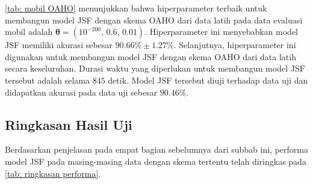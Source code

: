 \noindent \ref{tab: mobil OAHO} menunjukkan bahwa hiperparameter terbaik untuk membangun model JSF dengan skema OAHO dari data latih pada data evaluasi mobil adalah $\boldsymbol{\theta} = (10^{-200} \text{,  } \allowbreak \num{0,6} \text{,  } \allowbreak \num{0,01})$. Hiperparameter ini menyebabkan model JSF memiliki akurasi sebesar $\num{90,66}\% \pm \num{1,27}\%$. Selanjutnya, hiperparameter ini digunakan untuk membangun model JSF dengan skema OAHO dari data latih secara keseluruhan. Durasi waktu yang diperlukan untuk membangun model JSF tersebut adalah selama $845$ detik. Model JSF tersebut diuji terhadap data uji dan didapatkan akurasi pada data uji sebesar $\num{90,46}\%$.

\subsection{Ringkasan Hasil Uji}
\noindent Berdasarkan penjelasan pada empat bagian sebelumnya dari subbab ini, performa model JSF pada masing-masing data dengan skema tertentu telah diringkas pada \ref{tab: ringkasan performa}.

